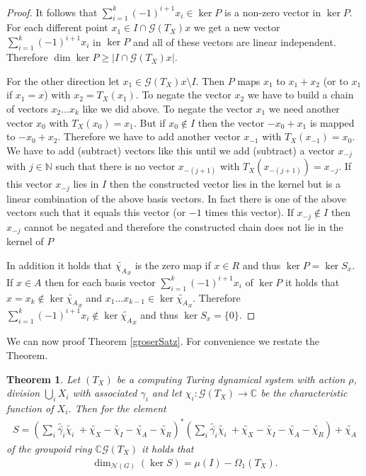 \documentclass[12pt,a4paper]{scrartcl}
\theoremstyle{plain}
\newtheorem{Theorem}{Theorem}[section]
\theoremstyle{definition}
\numberwithin{equation}{section}
\newcommand{\C}{\mathbb{C}} %
\newcommand{\N}{\mathbb{N}} %
\newcommand{\2}{\mathbb{Z} / 2 \mathbb{Z}}
\newcommand{\G}{\mathcal{G}}
\newcommand{\1}{\bar{1}}
\newcommand{\0}{\bar{0}}
\begin{document}
\begin{proof}
	It follows that $\sum_{i = 1}^{k} (-1)^{i + 1} x_i \in \ker P$ is a non-zero vector in $ \ker P$. For each different point $x_1 \in  I \cap \G (T_X)x$ we get a new vector $\sum_{i = 1}^{k} (-1)^{i + 1} x_i$ in $\ker P$ and all of these vectors are linear independent. Therefore $\dim \ker P \ge |I \cap \G (T_X)x| $.
	
	For the other direction let $x_1 \in \G (T_X)x \setminus I$. Then $P$ maps $x_1$ to $x_1 + x_2$ (or to $x_1$ if $x_1=x$) with $x_2 = T_X(x_1)$. To negate the vector $x_2$  we have to build a chain of vectors $x_2 \ldots x_k$ like we did above. To negate the vector $x_1$ we need another vector $x_0$ with $T_X(x_0) = x_1$. But if $x_0 \notin I$ then the vector $-x_0 + x_1$ is mapped to $-x_0 + x_2$. Therefore we have to add another vector $x_{-1}$ with $T_X(x_{-1}) = x_0$. We have to add (subtract) vectors like this until we add (subtract) a vector $x_{-j}$ with $j \in \N$ such that there is no vector $x_{-(j+1)}$ with $T_X(x_{-(j+1)}) = x_{-j}$. If this vector $x_{-j}$ lies in $I$ then the constructed vector lies in the kernel but is a linear combination of the above basis vectors. In fact there is one of the above vectors such that it equals this vector (or $-1$ times this vector). If $x_{-j} \notin I$ then $x_{-j}$ cannot be negated and therefore the constructed chain does not lie in the kernel of $P$
	
	
	In addition it holds that $\tilde{\chi_A}_x$ is the zero map if $x \in R$ and thus $\ker P = \ker S_x$. If $x \in A$ then for each basis vector $\sum_{i = 1}^{k} (-1)^{i + 1} x_i$ of $\ker P$  it holds that $x = x_k \notin \ker \tilde{\chi_A}_x$ and $x_1 \ldots x_{k - 1} \in \ker \tilde{\chi_A}_x$. Therefore $\sum_{i = 1}^{k} (-1)^{i + 1} x_i \notin \ker \tilde{\chi_A}_x$ and thus $\ker S_x = \{0\}$.
\end{proof}
We can now proof Theorem \ref{groserSatz}. For convenience we restate the Theorem.
\begin{Theorem} 
	Let $(T_X)$ be a computing Turing dynamical system with action $\rho$, division $\bigcup_i X_i$ with associated $\gamma_i$ and let $\chi_i \colon\G(T_X) \to \C$ be the characteristic function of $X_i$. Then for the element
	\begin{align*}
	S = (\sum_{i} \tilde{\bar{\gamma_i}} \tilde{\chi_i} \ + \tilde{\chi_X} - \tilde{\chi_I} - \tilde{\chi_A} - \tilde{\chi_R})^*(\sum_{i} \tilde{\bar{\gamma_i}} \tilde{\chi_i} \ + \tilde{\chi_X} - \tilde{\chi_I} - \tilde{\chi_A} - \tilde{\chi_R}) + \tilde{\chi_A}
	\end{align*}
	of the groupoid ring $\C \G(T_X)$ it holds that
	\begin{align*}
	\dim_{\mathcal{N}(G)}(\ker S) = \mu(I) - \Omega_1(T_X).
	\end{align*}
\end{Theorem}
\end{document}
